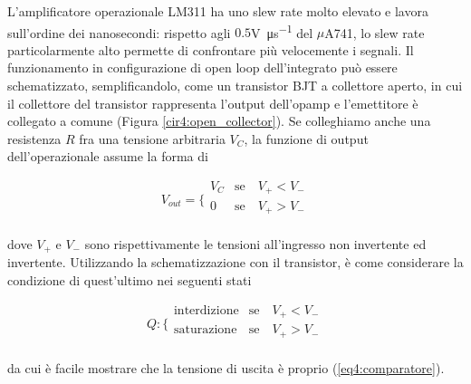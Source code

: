 L'amplificatore operazionale LM311 ha uno slew rate molto elevato e lavora sull'ordine dei nanosecondi: rispetto agli $0.5$\si{\volt\per\micro\second} del $\mu$A741, lo slew rate particolarmente alto permette di confrontare più velocemente i segnali.
Il funzionamento in configurazione di open loop dell'integrato può essere schematizzato, semplificandolo, come un transistor BJT a collettore aperto, in cui il collettore del transistor rappresenta l'output dell'opamp e l'emettitore è collegato a comune (Figura \ref{cir4:open_collector}).
Se colleghiamo anche una resistenza $R$ fra una tensione arbitraria $V_C$, la funzione di output dell'operazionale assume la forma di

\begin{equation}
V_{out} = \bigg \{
\begin{array}{rl}
V_C & \mathrm{se} \quad V_+ < V_- \\
0 & \mathrm{se} \quad V_+ > V_- \\
\end{array}
\label{eq4:comparatore}
\end{equation}

dove $V_+$ e $V_-$ sono rispettivamente le tensioni all'ingresso non invertente ed invertente. Utilizzando la schematizzazione con il transistor, è come considerare la condizione di quest'ultimo nei seguenti stati

\begin{equation}
Q : \bigg \{
\begin{array}{rl}
\mathrm{interdizione} & \mathrm{se} \quad V_+ < V_- \\
\mathrm{saturazione} & \mathrm{se} \quad V_+ > V_- \\
\end{array}
\label{eq4:comparatore_Q}
\end{equation}

da cui è facile mostrare che la tensione di uscita è proprio (\ref{eq4:comparatore}).

